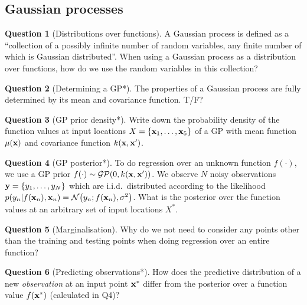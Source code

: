\documentclass[a4paper]{article}
\theoremstyle{definition}
\newtheorem{question}{Question}
\begin{document}
\subsection{Gaussian processes}
\begin{question}[Distributions over functions]
\label{q:gp-rv}
A Gaussian process is defined as a ``collection of a possibly infinite number of random variables, any finite number of which is Gaussian distributed''. When using a Gaussian process as a distribution over functions, how do we use the random variables in this collection?
\end{question}


\begin{question}[Determining a GP*]
\label{q:mean-cov-determine-gp}
The properties of a Gaussian process are fully determined by its mean and covariance function. T/F?
\end{question}

\begin{question}[GP prior density*]
\label{q:prior-density}
Write down the probability density of the function values at input locations $X = \{\mathbf{x}_1, \dots, \mathbf{x}_5\}$ of a GP with mean function $\mu(\mathbf{x})$ and covariance function $k(\mathbf{x}, \mathbf{x}')$.
\end{question}

\begin{question}[GP posterior*]
\label{q:posterior}
To do regression over an unknown function $f(\cdot)$, we use a GP prior $f(\cdot) \sim \mathcal{GP}(0, k(\mathbf{x}, \mathbf{x}'))$. We observe $N$ noisy observations $\mathbf{y} = \{y_1, \dots, y_N\}$ which are i.i.d.~distributed according to the likelihood $p(y_n| f(\vx_n), \vx_n) = \NormDist{y_n; f(\vx_n), \sigma^2}$. What is the posterior over the function values at an arbitrary set of input locations $X^*$.
\end{question}

\begin{question}[Marginalisation]
\label{q:marginalisation}
Why do we not need to consider any points other than the training and testing points when doing regression over an entire function?
\end{question}

\begin{question}[Predicting observations*]
\label{q:pred-obs}
How does the predictive distribution of a new \emph{observation} at an input point $\mathbf{x}^*$ differ from the posterior over a function value $f(\mathbf{x}^*)$ (calculated in Q4)?
\end{question}
\end{document}
